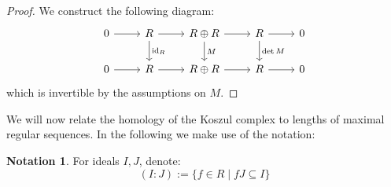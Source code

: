 \documentclass[12pt]{article}
\theoremstyle{plain}
\theoremstyle{definition}
\newtheorem{notation}[thm]{Notation}
\begin{document}
	\begin{proof}
		We construct the following diagram:
		\begin{equation}
			\begin{tikzcd}
				0\arrow[r] & R\arrow[r]\arrow[d,"{\operatorname{id}_R}"] & R \oplus R\arrow[r]\arrow[d,"{M}"] & R\arrow[d,"{\operatorname{det}M}"]\arrow[r] & 0\\
				0\arrow[r] & R\arrow[r] & R \oplus R\arrow[r] & R\arrow[r] & 0
			\end{tikzcd}
		\end{equation}
		which is invertible by the assumptions on $M$.
	\end{proof}
	We will now relate the homology of the Koszul complex to lengths of maximal regular sequences. In the following we make use of the notation:
	\begin{notation}
		For ideals $I,J$, denote:
		\begin{equation}
			(I:J) := \lbrace f \in R \mid fJ \subseteq I\rbrace
		\end{equation}
	\end{notation}
\end{document}
